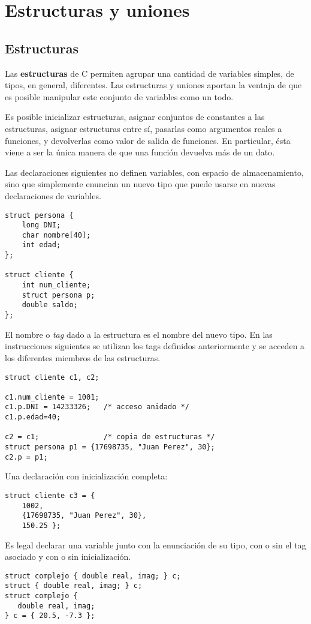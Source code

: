 \section{Estructuras y uniones}

\subsection{Estructuras}
Las \textbf{estructuras} de C permiten agrupar una cantidad de variables
simples, de tipos, en general, diferentes. Las estructuras y uniones aportan la
ventaja de que es posible manipular este conjunto de variables como un todo.

Es posible inicializar estructuras, asignar conjuntos de constantes a las
estructuras, asignar estructuras entre sí, pasarlas como argumentos reales a
funciones, y devolverlas como valor de salida de funciones. En particular, ésta
viene a ser la única manera de que una función devuelva más de un dato.

\begin{ejemplo}
Las declaraciones siguientes no definen variables, con espacio de
almacenamiento, sino que simplemente enuncian un nuevo tipo que puede usarse en
nuevas declaraciones de variables. 
\begin{lstlisting}
struct persona {
    long DNI;
    char nombre[40];
    int edad;
};

struct cliente {
    int num_cliente;
    struct persona p;
    double saldo;
};	
\end{lstlisting}
El nombre o \textit{tag} dado a la estructura es el
nombre del nuevo tipo. En las instrucciones siguientes se utilizan los tags
definidos anteriormente y se acceden a los diferentes miembros de las
estructuras.

\begin{lstlisting}
struct cliente c1, c2;

c1.num_cliente = 1001;
c1.p.DNI = 14233326;   /* acceso anidado */
c1.p.edad=40;

c2 = c1;               /* copia de estructuras */
struct persona p1 = {17698735, "Juan Perez", 30};
c2.p = p1;	
\end{lstlisting}
Una declaración con inicialización completa:
\begin{lstlisting}
struct cliente c3 = {
    1002,
    {17698735, "Juan Perez", 30},
    150.25 };
\end{lstlisting}
\end{ejemplo}

\begin{ejemplo}
Es legal declarar una variable  junto con la enunciación de su
tipo, con o sin el tag asociado y con o sin inicialización.
\begin{lstlisting}
struct complejo { double real, imag; } c;
struct { double real, imag; } c;
struct complejo {
   double real, imag;
} c = { 20.5, -7.3 };
\end{lstlisting}
\end{ejemplo}


